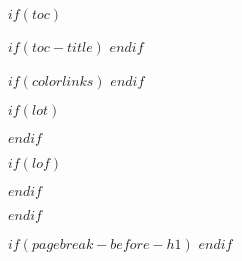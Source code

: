 $if(toc)$

$if(toc-title)$
\renewcommand*\contentsname{$toc-title$}
$endif$

\pagestyle{plain}

\renewcommand{\cftsecfont}{\normalfont}             %
\renewcommand{\cftsecpagefont}{\normalfont}         %
\renewcommand{\cftsubsecfont}{\normalfont}          %
\renewcommand{\cftsubsecpagefont}{\normalfont}      %
\renewcommand{\cftsubsubsecfont}{\normalfont}       %
\renewcommand{\cftsubsubsecpagefont}{\normalfont}   %

\renewcommand{\cftsecdotsep}{\cftdotsep}            %
\renewcommand{\cftsubsecdotsep}{\cftdotsep}         %
\renewcommand{\cftsubsubsecdotsep}{\cftdotsep}      %

$if(colorlinks)$
\hypersetup{linkcolor=$if(toccolor)$$toccolor$$else$$endif$}
$endif$

\setcounter{tocdepth}{$toc-depth$}

\tableofcontents

$if(lot)$
  \listoftables
$endif$

$if(lof)$
  \listoffigures
  \newpage
$endif$

\clearpage
$endif$

\pagestyle{fancy}
\fancyhead{} %
\fancyhead[L]{\fontsize{11}{12} \selectfont \color{gray} \nouppercase{\leftmark}} %

$if(pagebreak-before-h1)$
\let\oldsection\section
\renewcommand\section{\clearpage\oldsection}
$endif$
